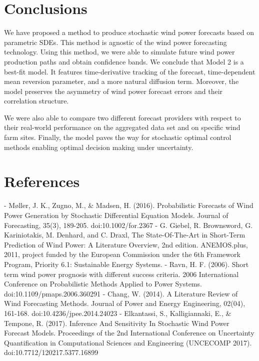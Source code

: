 \documentclass[10pt,twocolumn,letterpaper]{article}
\begin{document}
\section{Conclusions}

We have proposed a method to produce stochastic wind power forecasts based on parametric SDEs. This method is agnostic of the wind power forecasting technology. Using this method, we were able to simulate future wind power production paths and obtain confidence bands. We conclude that Model 2 is a best-fit model. It features time-derivative tracking of the forecast, time-dependent mean reversion parameter, and a more natural diffusion term. Moreover, the model preserves the asymmetry of wind power forecast errors and their correlation structure.

We were also able to compare two different forecast providers with respect to their real-world performance on the aggregated data set and on specific wind farm sites. Finally, the model paves the way for stochastic optimal control methods enabling optimal decision making under uncertainty.







\section*{References}
\begin{flushleft}
- M\o ller, J. K., Zugno, M., \& Madsen, H. (2016). Probabilistic Forecasts of Wind Power Generation by Stochastic Differential Equation Models. Journal of Forecasting, 35(3), 189-205. doi:10.1002/for.2367 \linebreak
- G. Giebel, R. Brownsword, G. Kariniotakis, M. Denhard, and C. Draxl, The State-Of-The-Art in Short-Term Prediction of Wind Power: A Literature Overview, 2nd edition. ANEMOS.plus, 2011, project funded by the European Commission under the 6th Framework Program, Priority 6.1: Sustainable Energy Systems.\linebreak
- Ravn, H. F. (2006). Short term wind power prognosis with different success criteria. 2006 International Conference on Probabilistic Methods Applied to Power Systems. doi:10.1109/pmaps.2006.360291 \linebreak
- Chang, W. (2014). A Literature Review of Wind Forecasting Methods. Journal of Power and Energy Engineering, 02(04), 161-168. doi:10.4236/jpee.2014.24023\linebreak
- Elkantassi, S., Kalligiannaki, E., \& Tempone, R. (2017). Inference And Sensitivity In Stochastic Wind Power Forecast Models. Proceedings of the 2nd International Conference on Uncertainty Quantification in Computational Sciences and Engineering (UNCECOMP 2017). doi:10.7712/120217.5377.16899
\end{flushleft}





% 
% 
\end{document}
